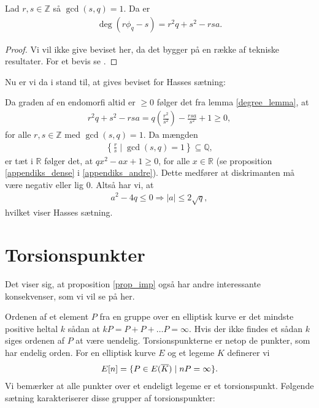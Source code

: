 \begin{lemma}
\label{degree_lemma}
Lad $r, s \in \mathbb{Z}$ så $\gcd(s, q) = 1$. Da er 
\begin{align*}
	\deg(r \phi_q - s) = r^2 q + s^2 - rsa.
\end{align*}
\end{lemma}
\begin{proof}
Vi vil ikke give beviset her, da det bygger på en række af tekniske resultater. For et bevis se \cite[s.~100]{Washington}.
\end{proof}

Nu er vi da i stand til, at gives beviset for Hasses sætning:

\begin{proofof}
Da graden af en endomorfi altid er $\geq 0$ følger det fra lemma \ref{degree_lemma}, at 
\begin{align*}
	r^2q+s^2 -rsa = q \left( \frac{r^2}{s^2} \right) - \frac{rsa}{s^2} + 1 
	\geq 0,
\end{align*}
for alle $r, s \in \mathbb{Z}$ med $\gcd(s, q)=1$. Da mængden
\begin{align*}
	\left\{ \frac{r}{s} \mid \gcd(s, q)=1 \right\} \subseteq \mathbb{Q},
\end{align*}
er tæt i $\mathbb{R}$ følger det, at $qx^2 - ax + 1 \geq 0$,
for alle $x \in \mathbb{R}$ (se proposition \ref{appendiks_dense} i \ref{appendiks_andre}). Dette medfører at diskrimanten må være negativ eller lig $0$.
Altså har vi, at 
\begin{align*}
	a^2 - 4q \leq 0 \Rightarrow |a| \leq 2 \sqrt{q},
\end{align*}
hvilket viser Hasses sætning.
\end{proofof}

\section{Torsionspunkter}
Det viser sig, at proposition \ref{prop_imp} også har andre interessante konsekvenser, som vi vil se på her. 

Ordenen af et element $P$ fra en gruppe over en elliptisk kurve er det mindste positive heltal $k$ sådan at 
$kP = P + P + \ldots P = \infty$. Hvis der ikke findes et sådan $k$ siges ordenen af $P$ at være uendelig. Torsionspunkterne er netop de punkter, som har endelig orden. For en elliptisk kurve $E$ og et legeme $K$ definerer vi
\begin{align*}
	E[n] = \{ P \in E(\overline{K}) \mid nP= \infty \}.
\end{align*}
Vi bemærker at alle punkter over et endeligt legeme er et torsionspunkt. Følgende sætning karakteriserer disse grupper af torsionspunkter:

